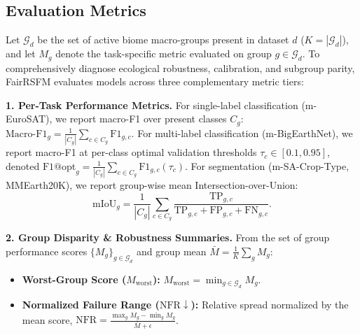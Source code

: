 \documentclass[10pt,twocolumn,letterpaper]{article}
\newcommand{\method}{FairRSFM\xspace}
\begin{document}
\subsection{Evaluation Metrics}
Let $\mathcal{G}_d$ be the set of active biome macro-groups present in dataset $d$ ($K = |\mathcal{G}_d|$), and let $M_g$ denote the task-specific metric evaluated on group $g \in \mathcal{G}_d$. To comprehensively diagnose ecological robustness, calibration, and subgroup parity, \method evaluates models across three complementary metric tiers:

\smallskip
\noindent\textbf{1. Per-Task Performance Metrics.}
For single-label classification (m-EuroSAT), we report macro-F1 over present classes $C_g$: $\mathrm{Macro\text{-}F1}_g = \frac{1}{|C_g|}\sum_{c\in C_g}\mathrm{F1}_{g,c}$. For multi-label classification (m-BigEarthNet), we report macro-F1 at per-class optimal validation thresholds $\tau_c \in [0.1, 0.95]$, denoted $\mathrm{F1@opt}_g = \frac{1}{|C_g|}\sum_{c\in C_g}\mathrm{F1}_{g,c}(\tau_c)$. For segmentation (m-SA-Crop-Type, MMEarth20K), we report group-wise mean Intersection-over-Union:
\begin{equation}
\mathrm{mIoU}_g = \frac{1}{|C_g|}\sum_{c\in C_g}\frac{\mathrm{TP}_{g,c}}{\mathrm{TP}_{g,c}+\mathrm{FP}_{g,c}+\mathrm{FN}_{g,c}}.
\end{equation}

\smallskip
\noindent\textbf{2. Group Disparity \& Robustness Summaries.}
From the set of group performance scores $\{M_g\}_{g\in\mathcal{G}_d}$ and group mean $\bar{M} = \frac{1}{K}\sum_{g} M_g$:
\begin{itemize}[leftmargin=*]
    \item \textbf{Worst-Group Score ($M_{\mathrm{worst}}$):} $M_{\mathrm{worst}} = \min_{g\in\mathcal{G}_d} M_g$.
    \item \textbf{Normalized Failure Range ($\mathrm{NFR} \downarrow$):} Relative spread normalized by the mean score, $\mathrm{NFR} = \frac{\max_g M_g - \min_g M_g}{\bar{M} + \epsilon}$.
\end{itemize}
\end{document}
